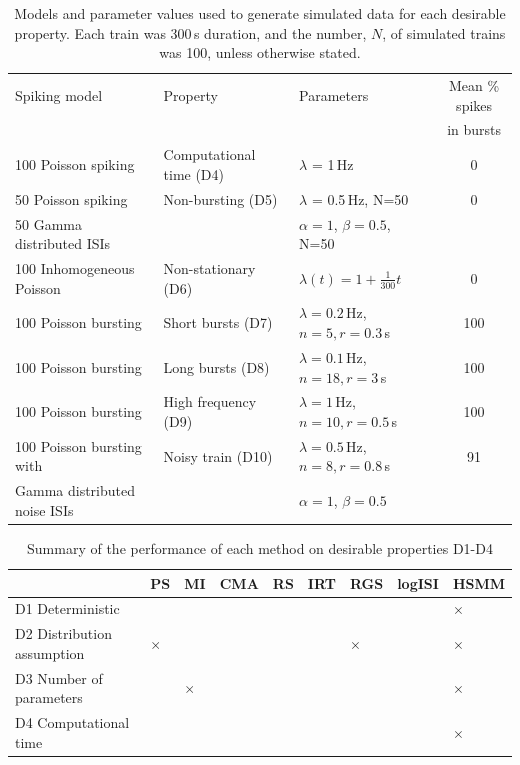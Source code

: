 \documentclass[12pt, titlepage]{article}
\begin{document}
	\begin{table}[h] \centering \small{
			\begin{tabular}{|l|l|l|c|}
				\hline
				Spiking model & Property & Parameters & Mean \% spikes 
				\\ & & & in bursts
				\\ \hline  \rowcolor{Gray} 100 Poisson spiking &  Computational time (D4) & $\lambda$ = 1$\,$Hz & 0 
				\\  50 Poisson spiking &  Non-bursting (D5) &  $\lambda$ = 0.5$\,$Hz, N=50 & 0 
				\\  50 Gamma distributed ISIs & & $\alpha=1$, $\beta = 0.5$, N=50 & 
				\\  \rowcolor{Gray}  100 Inhomogeneous Poisson &  Non-stationary (D6) & $\lambda(t) = 1+\frac{1}{300}t$ & 0 
				\\ 100 Poisson bursting &  Short bursts (D7) & $\lambda = 0.2\,$Hz, $n=5, r=0.3\,$s &  100
				\\  \rowcolor{Gray}   100 Poisson bursting & Long bursts (D8) &  $\lambda = 0.1\,$Hz, $n=18, r=3\,$s & 100 
				\\    100 Poisson bursting &  High frequency (D9) & $\lambda = 1\,$Hz, $n=10, r=0.5\,$s & 100
				\\  \rowcolor{Gray}  100 Poisson bursting with &  Noisy train (D10) & $\lambda = 0.5\,$Hz, $n=8, r=0.8\,$s & 91 
				\\  \rowcolor{Gray}  Gamma distributed noise ISIs& & $\alpha=1$, $\beta = 0.5$  & 
				\\ \hline
			\end{tabular}}
			\caption{Models and parameter values used to generate simulated data for each desirable property. Each train was 300$\,$s duration, and the number, $N$, of simulated trains was 100, unless otherwise stated.} \label{sim_params}
		\end{table}
			\begin{table} \centering  \begin{tabular}{|l|llllllll|}
					\hline
					& PS & MI & CMA & RS & IRT & RGS & logISI & HSMM
					\\ \hline
					\rowcolor{Gray} D1 Deterministic & \checkmark & \checkmark & \checkmark & \checkmark & \checkmark & \checkmark & \checkmark & $\times$
					\\ D2  Distribution assumption&  $\times$ & \checkmark & \checkmark & \checkmark & \checkmark & $\times$ & \checkmark & $\times$
					\\ \rowcolor{Gray} D3  Number of parameters&  \checkmark & $\times$ & \checkmark & \checkmark & \checkmark & \checkmark & \checkmark & $\times$
					\\D4  Computational time & \checkmark & \checkmark & \checkmark & \checkmark & \checkmark & \checkmark & \checkmark & $\times$
					\\ \hline
			\end{tabular}
			\caption{Summary of the performance of each method on desirable properties D1-D4} \label{des_results1}
			\end{table}
\end{document}
